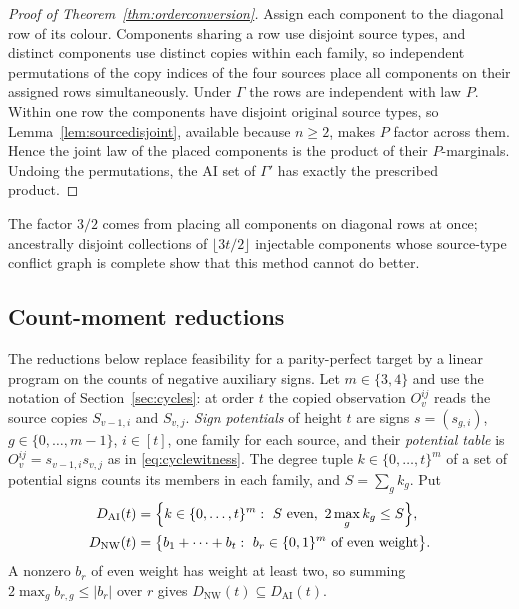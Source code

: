 \begin{proof}[Proof of Theorem~\ref{thm:orderconversion}]
Assign each component to the diagonal row of its colour. Components sharing a row use disjoint source types, and distinct components use distinct copies within each family, so independent permutations of the copy indices of the four sources place all components on their assigned rows simultaneously. Under $\Gamma$ the rows are independent with law $P$. Within one row the components have disjoint original source types, so Lemma~\ref{lem:sourcedisjoint}, available because $n\ge2$, makes $P$ factor across them. Hence the joint law of the placed components is the product of their $P$-marginals. Undoing the permutations, the AI set of $\Gamma'$ has exactly the prescribed product.
\end{proof}

The factor $3/2$ comes from placing all components on diagonal rows at once; ancestrally disjoint collections of $\lfloor3t/2\rfloor$ injectable components whose source-type conflict graph is complete show that this method cannot do better.

\subsection{Count-moment reductions}\label{app:countmoment}

The reductions below replace feasibility for a parity-perfect target by a linear program on the counts of negative auxiliary signs. Let $m\in\{3,4\}$ and use the notation of Section~\ref{sec:cycles}: at order $t$ the copied observation $O_v^{ij}$ reads the source copies $S_{v-1,i}$ and $S_{v,j}$. \emph{Sign potentials} of height $t$ are signs $s=(s_{g,i})$, $g\in\{0,\dots,m-1\}$, $i\in[t]$, one family for each source, and their \emph{potential table} is $O_v^{ij}=s_{v-1,i}s_{v,j}$ as in \eqref{eq:cyclewitness}. The degree tuple $k\in\{0,\dots,t\}^m$ of a set of potential signs counts its members in each family, and $S=\sum_gk_g$. Put
\[
\begin{aligned}
D_{\mathrm{AI}}(t)&=\Bigl\{k\in\{0,\dots,t\}^m:\ S\text{ even},\ 2\max_gk_g\le S\Bigr\},\\
D_{\mathrm{NW}}(t)&=\bigl\{b_1+\dots+b_t:\ b_r\in\{0,1\}^m\text{ of even weight}\bigr\}.
\end{aligned}
\]
A nonzero $b_r$ of even weight has weight at least two, so summing $2\max_gb_{r,g}\le|b_r|$ over $r$ gives $D_{\mathrm{NW}}(t)\subseteq D_{\mathrm{AI}}(t)$.

